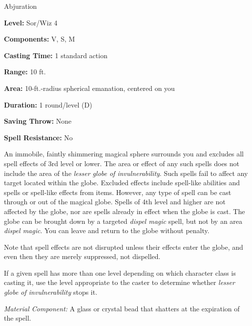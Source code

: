 \label{spell:Lesser Globe of Invulnerability}

Abjuration

\textbf{Level:} Sor/Wiz 4

\textbf{Components:} V, S, M

\textbf{Casting Time:} 1 standard action

\textbf{Range:} 10 ft.

\textbf{Area:} 10-ft.-radius spherical emanation, centered on you

\textbf{Duration:} 1 round/level (D)

\textbf{Saving Throw:} None

\textbf{Spell Resistance:} No

An immobile, faintly shimmering magical sphere surrounds you and excludes all spell 
effects of 3rd level or lower. The area or effect of any such spells does not include 
the area of the \textit{lesser globe of invulnerability}. Such spells fail to affect 
any target located within the globe. Excluded effects include spell-like abilities 
and spells or spell-like effects from items. However, any type of spell can be 
cast through or out of the magical globe. Spells of 4th level and higher are not 
affected by the globe, nor are spells already in effect when the globe is cast. 
The globe can be brought down by a targeted \textit{dispel magic} spell, but not 
by an area \textit{dispel magic}. You can leave and return to the globe without 
penalty.

Note that spell effects are not disrupted unless their effects enter the globe, 
and even then they are merely suppressed, not dispelled. 

If a given spell has more than one level depending on which character class is 
casting it, use the level appropriate to the caster to determine whether \textit{lesser 
globe of invulnerability} stops it.

\textit{Material Component:} A glass or crystal bead that shatters at the expiration 
of the spell.

